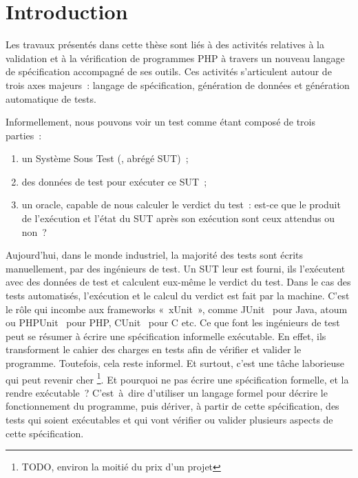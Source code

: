 \chapter{Introduction}
\label{chapter:introduction}

\minitoc

Les travaux présentés dans cette thèse sont liés à des activités relatives à la
validation et à la vérification de programmes PHP à travers un nouveau langage
de spécification accompagné de ses outils. Ces activités s'articulent autour de
trois axes majeurs~: langage de spécification, génération de données et
génération automatique de tests.

Informellement, nous pouvons voir un test comme étant composé de trois parties~:

\begin{enumerate}

\item un Système Sous Test (, abrégé {\strong
SUT})~;

\item des {\strong données de test} pour exécuter ce SUT~;

\item un {\strong oracle}, capable de nous calculer le verdict du test~: est-ce
que le produit de l'exécution et l'état du SUT après son exécution sont ceux
attendus ou non~?

\end{enumerate}

Aujourd'hui, dans le monde industriel, la majorité des tests sont écrits
{\strong manuellement}, par des ingénieurs de test. Un SUT leur est fourni, ils
l'exécutent avec des données de test et calculent eux-même le verdict du test.
Dans le cas des tests {\strong automatisés}, l'exécution et le calcul du verdict
est fait par la machine. C'est le rôle qui incombe aux frameworks «~xUnit~»,
comme JUnit~ pour Java, atoum~ ou
PHPUnit~ pour PHP, CUnit~ pour C etc. Ce que font
les ingénieurs de test peut se résumer à écrire une spécification informelle
exécutable. En effet, ils transforment le cahier des charges en tests afin de
vérifier et valider le programme. Toutefois, cela reste informel. Et surtout,
c'est une tâche laborieuse qui peut revenir cher \footnote{TODO, environ la
moitié du prix d'un projet}. Et pourquoi ne pas écrire une spécification
formelle, et la rendre exécutable~?  C'est~à~dire d'utiliser un langage formel
pour décrire le fonctionnement du programme, puis dériver, à partir de cette
spécification, des tests qui soient exécutables et qui vont vérifier ou valider
plusieurs aspects de cette spécification. \\

